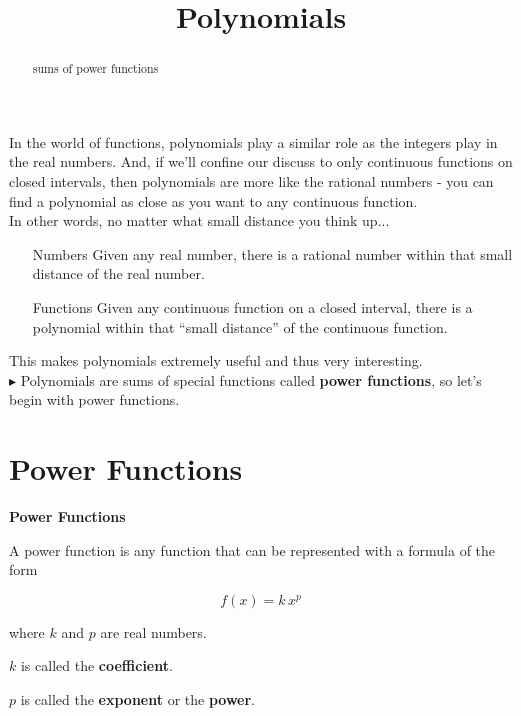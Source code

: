 \documentclass{ximera}
\title{Polynomials}
\begin{document}
\begin{abstract}
sums of power functions
\end{abstract}
\maketitle


In the world of functions, polynomials play a similar role as the integers play in the real numbers. And, if we'll confine our discuss to only continuous functions on closed intervals, then polynomials are more like the rational numbers - you can find a polynomial as close as you want to any continuous function. \\


In other words, no matter what small distance you think up...

\begin{itemize}
\item [Numbers] Given any real number, there is a rational number within that small distance of the real number.

\item [Functions] Given any continuous function on a closed interval, there is a polynomial within that ``small distance'' of the continuous function.
\end{itemize}

This makes polynomials extremely useful and thus very interesting. \\


$\blacktriangleright$ Polynomials are sums of special functions called \textbf{power functions}, so let's begin with power functions.













\section{Power Functions}

\begin{definition} \textbf{\textcolor{green!50!black}{Power Functions}}

A power function is any function that can be represented with a formula of the form

\[   f(x) = k \, x^p      \]

where $k$ and $p$ are real numbers.

$k$ is called the \textbf{coefficient}.

$p$ is called the \textbf{exponent} or the \textbf{power}.


\end{definition}
\end{document}
